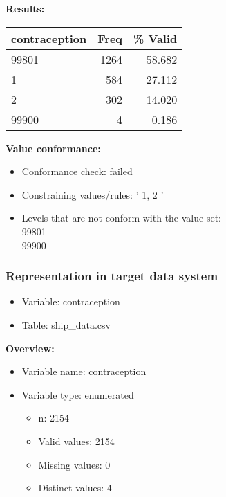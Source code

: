 \documentclass[
]{article}
\providecommand{\tightlist}{%
  \setlength{\itemsep}{0pt}\setlength{\parskip}{0pt}}
\begin{document}
\textbf{Results:}\\

\begin{table}[H]
\centering
\begin{tabular}{l|r|r}
\hline
\textbf{contraception} & \textbf{Freq} & \textbf{\% Valid}\\
\hline
99801 & 1264 & 58.682\\
\hline
1 & 584 & 27.112\\
\hline
2 & 302 & 14.020\\
\hline
99900 & 4 & 0.186\\
\hline
\end{tabular}
\end{table}

\textbf{Value conformance:}

\begin{itemize}
\tightlist
\item
  Conformance check: failed
\item
  Constraining values/rules: ' 1, 2 '
\item
  Levels that are not conform with the value set:\\
  99801\\
  99900
\end{itemize}

\newpage

\hypertarget{representation-in-target-data-system-2}{%
\subsubsection{\texorpdfstring{Representation in \textbf{target} data
system}{Representation in target data system}}\label{representation-in-target-data-system-2}}

\begin{itemize}
\tightlist
\item
  Variable: contraception
\item
  Table: ship\_data.csv
\end{itemize}

\textbf{Overview:}

\begin{itemize}
\tightlist
\item
  Variable name: contraception
\item
  Variable type: enumerated

  \begin{itemize}
  \tightlist
  \item
    n: 2154
  \item
    Valid values: 2154
  \item
    Missing values: 0
  \item
    Distinct values: 4
  \end{itemize}
\end{itemize}
\end{document}
